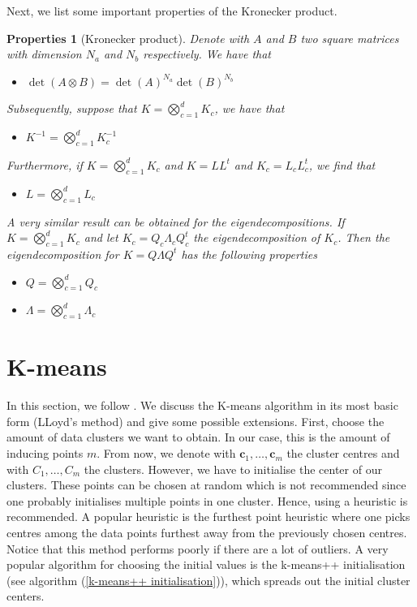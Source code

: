 \documentclass[12pt,a4paper,oneside]{book}
\newtheorem{Properties}{Properties}
\begin{document}
{Next, we list some important properties of the Kronecker product. 
\begin{Properties}[Kronecker product]\label{Properties_Kronecker}
Denote with $A$ and $B$ two square matrices with dimension $N_a$ and $N_b$ respectively. We have that 
\begin{itemize}
\item $\det(A \otimes B) = \det(A)^{N_a}  \det(B)^{N_b}$
\end{itemize}
Subsequently, suppose that $K = \bigotimes_{c=1}^d K_c$, we have that 
\begin{itemize}[resume]
\item $K^{-1} = \bigotimes\limits_{c=1}^d K_c^{-1}$
\end{itemize}
Furthermore, if $K = \bigotimes_{c=1}^d K_c$ and $K = L L^t$ and $K_c = L_c L_c^t$, we find that
\begin{itemize}[resume]
\item $L = \bigotimes\limits_{c=1}^d L_c$
\end{itemize}
A very similar result can be obtained for the eigendecompositions. If $K = \bigotimes_{c=1}^d K_c$ and let $K_c = Q_c \Lambda_c Q_c^t$ the eigendecomposition of $K_c$. Then the eigendecomposition for $K = Q \Lambda Q^t$ has the following properties
\begin{itemize}[resume]
\item $Q = \bigotimes\limits_{c=1}^d Q_c$
\item $\Lambda = \bigotimes\limits_{c=1}^d \Lambda_c$
\end{itemize}

\end{Properties}

\section{K-means} \label{appendix_kmeans}

In this section, we follow \cite{pptkmeans}. We discuss the K-means algorithm in its most basic form (LLoyd's method) and give some possible extensions. First, choose the amount of data clusters we want to obtain. In our case, this is the amount of inducing points $m$. From now, we denote with $\bm{c}_1, \ldots, \bm{c}_m $ the cluster centres and with $C_1, \ldots, C_m $ the clusters. However, we have to initialise the center of our clusters. These points can be chosen at random which is not recommended since one probably initialises multiple points in one cluster. Hence, using a heuristic is recommended. A popular heuristic is the furthest point heuristic where one picks centres among the data points furthest away from the previously chosen centres. Notice that this method performs poorly if there are a lot of outliers. A very popular algorithm for choosing the initial values is the k-means++ initialisation (see algorithm (\ref{k-means++ initialisation})), which spreads out the initial cluster centers. 

}
\end{document}
